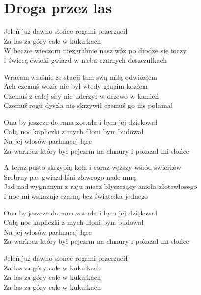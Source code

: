 \section{Droga przez las}
\begin{text}
    \hfill\break
Jeleń już dawno słońce rogami przerzucił\\
Za las za góry całe w kukułkach\\
W beczce wieczoru niezgrabnie nasz wóz po drodze się toczy\\
I świecą ćwieki gwiazd w nieba czarnych deszczułkach

Wracam właśnie ze stacji tam swą miłą odwiozłem\\
Ach czemuś wozie nie był wtedy głupim kozłem\\
Czemuś z całej siły nie uderzył w drzewo w kamień\\
Czemuś rogu dyszla nie skrzywił czemuś go nie połamał

Ona by jeszcze do rana została i bym jej dziękował\\
Całą noc kapliczki z mych dłoni bym budował\\
Na jej włosów pachnącej łące\\
Za warkocz który był pejczem na chmury i pokazał mi słońce

A teraz pusto skrzypią koła i coraz węższy wśród świerków\\
Srebrny pas gwiazd lśni złowrogo nade mną\\
Jad nad wygnanym z raju miecz błyszczący anioła złotowłosego\\
I noc mi wskazuje czarną bez światełka jednego

Ona by jeszcze do rana została i bym jej dziękował\\
Całą noc kapliczki z mych dłoni bym budował\\
Na jej włosów pachnącej łące\\
Za warkocz który był pejczem na chmury i pokazał mi słońce

Jeleń już dawno słońce rogami przerzucił\\
Za las za góry całe w kukułkach\\
Za las za góry całe w kukułkach\\
Za las za góry całe w kukułkach
\end{text}
